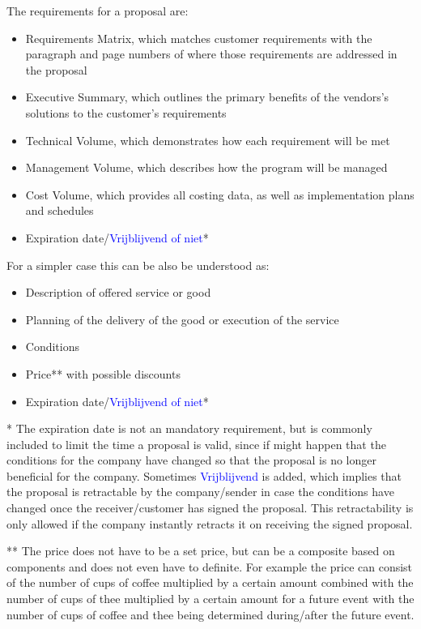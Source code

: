 \documentclass{report}
\begin{document}
The requirements for a proposal are:
\begin{itemize}
	\item Requirements Matrix, which matches customer requirements with the paragraph and page numbers of where those requirements are addressed in the proposal
	\item Executive Summary, which outlines the primary benefits of the vendors's solutions to the customer's requirements
	\item Technical Volume, which demonstrates how each requirement will be met
	\item Management Volume, which describes how the program will be managed
	\item Cost Volume, which provides all costing data, as well as implementation plans and schedules
	\item Expiration date/\textcolor{blue}{Vrijblijvend of niet}*
\end{itemize}
For a simpler case this can be also be understood as:
\begin{itemize}
	\item Description of offered service or good
	\item Planning of the delivery of the good or execution of the service
	\item Conditions 
	\item Price** with possible discounts
	\item Expiration date/\textcolor{blue}{Vrijblijvend of niet}*
\end{itemize}
* The expiration date is not an mandatory requirement, but is commonly included to limit the time a proposal is valid, since if might happen that the conditions for the company have changed so that the proposal is no longer beneficial for the company. Sometimes \textcolor{blue}{Vrijblijvend} is added, which implies that the proposal is retractable by the company/sender in case the conditions have changed once the receiver/customer has signed the proposal. This retractability is only allowed if the company instantly retracts it on receiving the signed proposal.

** The price does not have to be a set price, but can be a composite based on components and does not even have to definite. For example the price can consist of the number of cups of coffee multiplied by a certain amount combined with the number of cups of thee multiplied by a certain amount for a future event with the number of cups of coffee and thee being determined during/after the future event.
\end{document}
